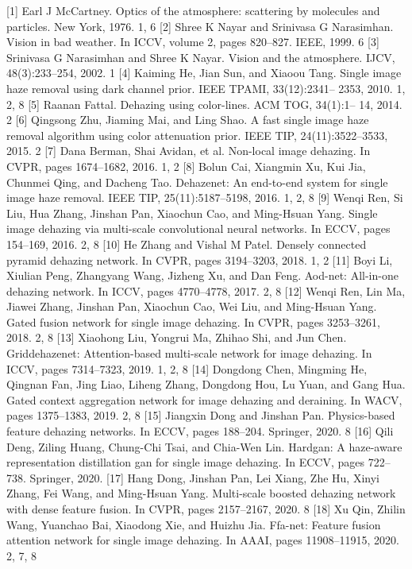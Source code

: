 [1] Earl J McCartney. Optics of the atmosphere: scattering by molecules and particles. New York, 1976. 1, 6
[2] Shree K Nayar and Srinivasa G Narasimhan. Vision in bad weather. In ICCV, volume 2, pages 820–827. IEEE, 1999. 6 [3] Srinivasa G Narasimhan and Shree K Nayar. Vision and the atmosphere. IJCV, 48(3):233–254, 2002. 1 [4] Kaiming He, Jian Sun, and Xiaoou Tang. Single image haze removal using dark channel prior. IEEE TPAMI, 33(12):2341– 2353, 2010. 1, 2, 8
[5] Raanan Fattal. Dehazing using color-lines. ACM TOG, 34(1):1– 14, 2014. 2 [6] Qingsong Zhu, Jiaming Mai, and Ling Shao. A fast single image haze removal algorithm using color attenuation prior. IEEE TIP, 24(11):3522–3533, 2015. 2 [7] Dana Berman, Shai Avidan, et al. Non-local image dehazing. In CVPR, pages 1674–1682, 2016. 1, 2 [8] Bolun Cai, Xiangmin Xu, Kui Jia, Chunmei Qing, and Dacheng Tao. Dehazenet: An end-to-end system for single image haze removal. IEEE TIP, 25(11):5187–5198, 2016. 1, 2, 8
[9] Wenqi Ren, Si Liu, Hua Zhang, Jinshan Pan, Xiaochun Cao, and Ming-Hsuan Yang. Single image dehazing via multi-scale convolutional neural networks. In ECCV, pages 154–169, 2016. 2, 8
[10] He Zhang and Vishal M Patel. Densely connected pyramid dehazing network. In CVPR, pages 3194–3203, 2018. 1, 2
[11] Boyi Li, Xiulian Peng, Zhangyang Wang, Jizheng Xu, and Dan Feng. Aod-net: All-in-one dehazing network. In ICCV, pages 4770–4778, 2017. 2, 8
[12] Wenqi Ren, Lin Ma, Jiawei Zhang, Jinshan Pan, Xiaochun Cao, Wei Liu, and Ming-Hsuan Yang. Gated fusion network for single image dehazing. In CVPR, pages 3253–3261, 2018. 2, 8
[13] Xiaohong Liu, Yongrui Ma, Zhihao Shi, and Jun Chen. Griddehazenet: Attention-based multi-scale network for image dehazing. In ICCV, pages 7314–7323, 2019. 1, 2, 8
[14] Dongdong Chen, Mingming He, Qingnan Fan, Jing Liao, Liheng Zhang, Dongdong Hou, Lu Yuan, and Gang Hua. Gated context aggregation network for image dehazing and deraining. In WACV, pages 1375–1383, 2019. 2, 8
[15] Jiangxin Dong and Jinshan Pan. Physics-based feature dehazing networks. In ECCV, pages 188–204. Springer, 2020. 8
[16] Qili Deng, Ziling Huang, Chung-Chi Tsai, and Chia-Wen Lin. Hardgan: A haze-aware representation distillation gan for single image dehazing. In ECCV, pages 722–738. Springer, 2020.
[17] Hang Dong, Jinshan Pan, Lei Xiang, Zhe Hu, Xinyi Zhang, Fei Wang, and Ming-Hsuan Yang. Multi-scale boosted dehazing network with dense feature fusion. In CVPR, pages 2157–2167, 2020. 8
[18] Xu Qin, Zhilin Wang, Yuanchao Bai, Xiaodong Xie, and Huizhu Jia. Ffa-net: Feature fusion attention network for single image dehazing. In AAAI, pages 11908–11915, 2020. 2, 7, 8
